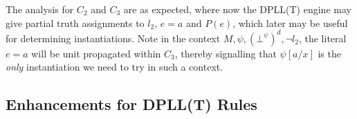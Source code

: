 \documentclass{llncs}
\begin{document}


The analysis for $C_2$ and $C_3$ are as expected, where now the DPLL(T) engine may give partial truth assignments to $l_2$, $e = a$ and $P( e )$, which later may be useful for determining instantiations.
Note in the context $M, \psi, ( \bot^\psi )^d, \neg l_2$, the literal $e = a$ will be unit propagated within $C_3$, thereby signalling that $\psi[a/x]$ is the \emph{only} instantiation we need to try in such a context.

\begin{comment}
We define the following invariant for DPLL(T): \\

{\bf Invariant 1}:
For all DPLL(T) states $M \parallel F$, the only instance of literal $\bot^\psi$ in $F$ occur in clauses $C_1 \ldots C_n$ such that $C_1 \ldots C_n$ is logically equivalent to $( \neg \psi \vee \neg \bot^\psi \vee \neg \psi[\bar{e}/\bar{x}] )$ where $\bar{e} \mapsto^I \psi$.


It can be shown that counterexample $\forall$-Inst maintains Invariants 1.
Also note that since counterexample literals $\bot^\psi$ have no meaning apart from representing boolean values, no lemma added to $F$ by $T$-Learn will violate Invariant 1.
\end{comment}

\subsection{Enhancements for DPLL(T) Rules}
\label{sec:enhance-dpllt}
\end{document}
